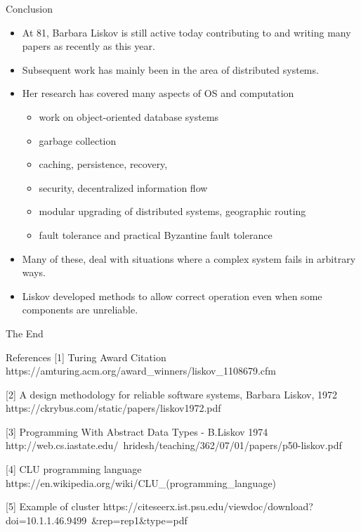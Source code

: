 \documentclass{beamer}
\begin{document}
\begin{frame}{Conclusion}
\begin{itemize}
\item At 81, Barbara Liskov is still active today contributing to and writing many papers as recently as this year.
\item Subsequent work has mainly been in the area of distributed systems. 
\item Her research has covered many aspects of OS and computation \begin{itemize}
    \item work on object-oriented database systems
    \item  garbage collection
    \item caching, persistence, recovery, 
    \item security, decentralized information flow
    \item modular upgrading of distributed systems, geographic routing
    \item fault tolerance and practical Byzantine fault tolerance
\end{itemize}  
\item Many of these, deal with situations where a complex system fails in arbitrary ways. 
\item Liskov developed methods to allow correct operation even when some components are unreliable.
 

\end{itemize}
\end{frame}




\begin{frame}
\Huge{\centerline{The End}}
\end{frame}

\begin{frame}{References}
[1] {Turing Award Citation}
https://amturing.acm.org/award_winners/liskov_1108679.cfm
\newline

[2] {A  design  methodology  for  reliable  software   systems, Barbara Liskov, 1972} https://ckrybus.com/static/papers/liskov1972.pdf
\newline 

[3] {Programming With Abstract Data Types - B.Liskov 1974}
http://web.cs.iastate.edu/~hridesh/teaching/362/07/01/papers/p50-liskov.pdf
\newline

[4] {CLU programming language} {https://en.wikipedia.org/wiki/CLU_(programming_language)}
\newline

[5] {Example of cluster} 
\newline
https://citeseerx.ist.psu.edu/viewdoc/download?doi=10.1.1.46.9499\
&rep=rep1\&type=pdf



\end{frame}
\end{document}
